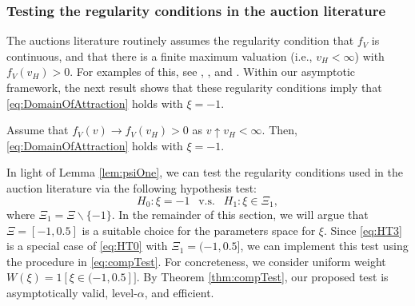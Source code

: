 \subsubsection{Testing the regularity conditions in the auction literature}\label{sec:HypApplication}

The auctions literature routinely assumes the regularity condition that $f_{V}$ is continuous, and that there is a finite maximum valuation (i.e., $v_H<\infty $) with $f_{V}(v_H)>0$. For examples of this, see \cite{MaskinRiley1984}, \cite{guerre2000}, and \cite{GuerreLuo2022}. Within our asymptotic framework, the next result shows that these regularity conditions imply that \eqref{eq:DomainOfAttraction} holds with $\xi =-1$.

\begin{lemma}\label{lem:psiOne} 
Assume that $f_{V}( v) \to f_{V}( v_H) >0 $ as $v\uparrow v_H<\infty $. Then, \eqref{eq:DomainOfAttraction} holds with $\xi =-1$.
\end{lemma}

In light of Lemma \ref{lem:psiOne}, we can test the regularity conditions used in the auction literature via the following hypothesis test:
\begin{equation}
H_{0}:\xi =-1~~\text{ v.s. }~~H_{1}:\xi \in \Xi_1,\label{eq:HT3}
\end{equation}
where $\Xi_1 = \Xi \backslash \{-1\}$. In the remainder of this section, we will argue that $\Xi =[-1,0.5]$ is a suitable choice for the parameters space for $\xi$. Since \eqref{eq:HT3} is a special case of \eqref{eq:HT0} with $\Xi _{1} =(-1,0.5]$, we can implement this test using the procedure in \eqref{eq:compTest}. For concreteness, we consider uniform weight $W( \xi ) =1[ \xi \in (-1,0.5]] $. By Theorem \ref{thm:compTest}, our proposed test is asymptotically valid, level-$\alpha$, and efficient.

